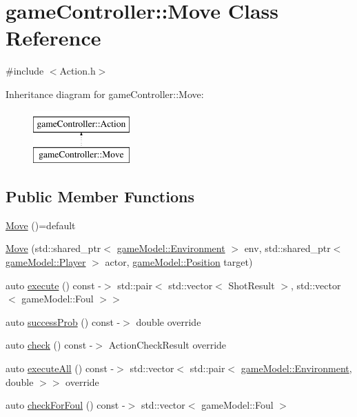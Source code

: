 \hypertarget{classgame_controller_1_1_move}{\section{game\-Controller\-:\-:Move Class Reference}
\label{classgame_controller_1_1_move}
}


{\ttfamily \#include $<$Action.\-h$>$}

Inheritance diagram for game\-Controller\-:\-:Move\-:\begin{figure}[H]
\begin{center}
\leavevmode
\includegraphics[height=2.000000cm]{classgame_controller_1_1_move}
\end{center}
\end{figure}
\subsection*{Public Member Functions}
\begin{DoxyCompactItemize}
\item 
\hyperlink{classgame_controller_1_1_move_a7336aaeac611eaa78bfeb93d978f9e7c}{Move} ()=default
\item 
\hyperlink{classgame_controller_1_1_move_a6b27870ecb6182853feb7607c78bd5bb}{Move} (std\-::shared\-\_\-ptr$<$ \hyperlink{classgame_model_1_1_environment}{game\-Model\-::\-Environment} $>$ env, std\-::shared\-\_\-ptr$<$ \hyperlink{classgame_model_1_1_player}{game\-Model\-::\-Player} $>$ actor, \hyperlink{structgame_model_1_1_position}{game\-Model\-::\-Position} target)
\item 
auto \hyperlink{classgame_controller_1_1_move_a57822a002472b25276be2a6678569f72}{execute} () const -\/$>$ std\-::pair$<$ std\-::vector$<$ Shot\-Result $>$, std\-::vector$<$ game\-Model\-::\-Foul $>$$>$
\item 
auto \hyperlink{classgame_controller_1_1_move_ae36dc4d09881c114cc8c9192e6f85988}{success\-Prob} () const -\/$>$ double override
\item 
auto \hyperlink{classgame_controller_1_1_move_a5ff9c2a76dbfdc59a0dd206b74279be0}{check} () const -\/$>$ Action\-Check\-Result override
\item 
auto \hyperlink{classgame_controller_1_1_move_a3b9266d42dfc66fe16c228a08927cb8a}{execute\-All} () const -\/$>$ std\-::vector$<$ std\-::pair$<$ \hyperlink{classgame_model_1_1_environment}{game\-Model\-::\-Environment}, double $>$$>$ override
\item 
auto \hyperlink{classgame_controller_1_1_move_acf276f2198a6229660727956a5f156ad}{check\-For\-Foul} () const -\/$>$ std\-::vector$<$ game\-Model\-::\-Foul $>$
\end{DoxyCompactItemize}


